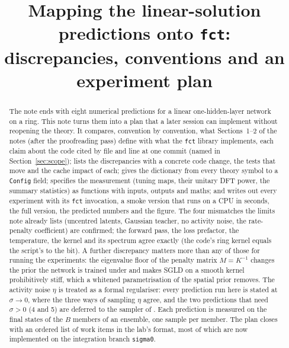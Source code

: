 \documentclass[11pt,a4paper]{article}
\title{Mapping the linear-solution predictions onto \texttt{fct}:\\discrepancies, conventions and an experiment plan}
\author{}
\date{}
\newcommand{\code}[1]{\texttt{#1}}
\begin{document}
\maketitle

\begin{abstract}
The note  ends with eight numerical predictions for a linear one-hidden-layer network on a ring. This note turns them into a plan that a later session can implement without reopening the theory. It compares, convention by convention, what Sections~1--2 of the notes (after the proofreading pass) define with what the \code{fct} library implements, each claim about the code cited by file and line at one commit (named in Section~\ref{sec:scope}); lists the discrepancies with a concrete code change, the tests that move and the cache impact of each; gives the dictionary from every theory symbol to a \code{Config} field; specifies the measurement (tuning maps, their unitary DFT power, the summary statistics) as functions with inputs, outputs and maths; and writes out every experiment with its \code{fct} invocation, a smoke version that runs on a CPU in seconds, the full version, the predicted numbers and the figure. The four mismatches the limits note already lists (uncentred latents, Gaussian teacher, no activity noise, the rate-penalty coefficient) are confirmed; the forward pass, the loss prefactor, the temperature, the kernel and its spectrum agree exactly (the code's ring kernel equals the script's to the bit). A further discrepancy matters more than any of those for running the experiments: the eigenvalue floor of the penalty matrix $M = K^{-1}$ changes the prior the network is trained under and makes SGLD on a smooth kernel prohibitively stiff, which a whitened parametrisation of the spatial prior removes. The activity noise $\eta$ is treated as a formal regulariser: every prediction run here is stated at $\sigma\to0$, where the three ways of sampling $\eta$ agree, and the two predictions that need $\sigma > 0$ (4 and 5) are deferred to the sampler of . Each prediction is measured on the final states of the $B$ members of an ensemble, one sample per member. The plan closes with an ordered list of work items in the lab's format, most of which are now implemented on the integration branch \code{sigma0}.
\end{abstract}
\end{document}
